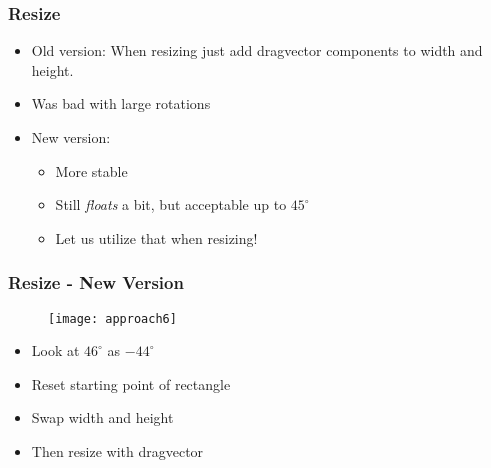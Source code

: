 
\begin{frame}
	\frametitle{Resize}
	\begin{itemize}
		\item Old version: When resizing just add dragvector components to width and height.
		\item Was bad with large rotations
		\item New version:
		\begin{itemize}
			\item More stable
			\item Still \textit{floats} a bit, but acceptable up to $45 ^\circ$
			\item Let us utilize that when resizing!
		\end{itemize}
	\end{itemize}
\end{frame}

\begin{frame}
	\frametitle{Resize - New Version}
			\begin{figure}
			\centering
				\texttt{[image: approach6]}
			\end{figure}
			\begin{itemize}
			\item Look at $46^\circ$ as $-44^\circ$
			\item Reset starting point of rectangle
			\item Swap width and height
			\item Then resize with dragvector
			\end{itemize}
			
\end{frame}

